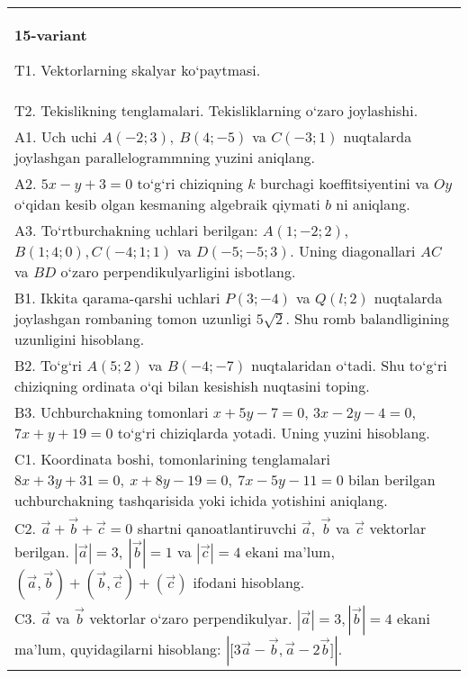 \documentclass{article}
\begin{document}
\begin{tabular}{m{17cm}}
\textbf{15-variant}

T1. 
Vektorlarning skalyar ko‘paytmasi.
 \\
T2. 
Tekislikning tenglamalari. Tekisliklarning o‘zaro joylashishi.
 \\
A1. 
Uch uchi $A (-2;3), \ B (4;-5) $ va
$C (-3;1)$ nuqtalarda joylashgan parallelogrammning yuzini aniqlang.
 \\
A2. 
$5x-y+3=0$ to‘g‘ri chiziqning $k$ burchagi
koeffitsiyentini va $Oy$ o‘qidan kesib olgan kesmaning algebraik
qiymati $b$ ni aniqlang.
 \\
A3. 
To‘rtburchakning uchlari berilgan:
$A (1; - 2;2) $, $B (1;4;0),C (- 4;1;1) $ va $D (- 5; -5;3) $. Uning diagonallari $AC$ va $BD$ o‘zaro
perpendikulyarligini isbotlang.
 \\
B1. 
Ikkita qarama-qarshi uchlari $P (3; -4) $ va $Q (l;2) $ nuqtalarda joylashgan rombaning tomon uzunligi \(5\sqrt{2}\). Shu romb balandligining uzunligini hisoblang.
 \\
B2. 
To‘g‘ri \(A (5;2) \) va \(B (-4; -7) \) nuqtalaridan o‘tadi.
Shu to‘g‘ri chiziqning ordinata o‘qi bilan kesishish nuqtasini toping.
 \\
B3. 
Uchburchakning tomonlari \(x+5y-7=0\),
\(3x-2y-4=0\), \(7x+y+19=0\) to‘g‘ri chiziqlarda yotadi. Uning
yuzini hisoblang.
 \\
C1. 
Koordinata boshi, tomonlarining tenglamalari
\(8x+3y+31=0,\ x+8y-19=0,\ 7x-5y-11=0\) bilan
berilgan uchburchakning tashqarisida yoki ichida yotishini aniqlang.
 \\
C2. 
$\vec{a} + \vec{b} + \vec{c} = 0$ shartni qanoatlantiruvchi $\vec{a},\ \vec{b}$ va $\vec{c}$ vektorlar berilgan. $|\vec{a}| = 3,\ |\vec{b}| = 1$ va $|\vec{c}| = 4$ ekani ma’lum, $\left(\vec{a},\vec{b} \right) + \left(\vec{b},\vec{c} \right) + (\vec{c}) $ ifodani hisoblang.
 \\
C3. 
$\vec{a}$ va $\vec{b}$ vektorlar o‘zaro perpendikulyar. $|\vec{a}| = 3,|\vec{b}| = 4$ ekani ma’lum, quyidagilarni hisoblang:
$|\lbrack 3\vec{a} - \vec{b},\vec{a}-2\vec{b}\rbrack|$.
 \\

\end{tabular}
\vspace{1cm}
\end{document}
